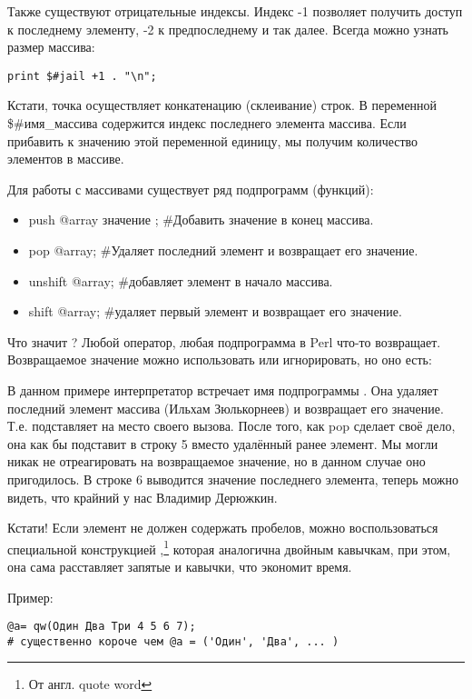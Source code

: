 Также существуют отрицательные индексы. Индекс -1 позволяет получить 
доступ к последнему элементу, -2 к предпоследнему и так далее. Всегда можно 
узнать размер массива:

\begin{verbatim}
print $#jail +1 . "\n";
\end{verbatim}

Кстати, точка осуществляет конкатенацию (склеивание) строк. В переменной 
\$\#имя\_массива содержится индекс последнего элемента массива. Если 
прибавить к значению этой переменной единицу, мы получим количество 
элементов в массиве.

Для работы с массивами существует ряд подпрограмм (функций):

\begin{itemize}
\item push @array значение ; \#Добавить значение в конец массива.
\item pop @array; \#Удаляет последний элемент и возвращает его значение.
\item unshift @array; \#добавляет элемент в начало массива.
\item shift @array; \#удаляет первый элемент и возвращает его значение.
\end{itemize}

Что значит  ? Любой оператор, любая подпрограмма в
Perl что-то возвращает. Возвращаемое значение можно использовать или
игнорировать, но оно есть:


В данном примере интерпретатор встречает имя подпрограммы . Она 
удаляет последний элемент массива (Ильхам Зюлькорнеев) и возвращает его 
значение. Т.е. подставляет на место своего вызова. После того, как pop 
сделает своё дело, она как бы подставит в строку 5 вместо  
удалённый ранее элемент. Мы могли никак не отреагировать на возвращаемое 
значение, но в данном случае оно пригодилось. В строке 6 выводится 
значение последнего элемента, теперь можно видеть, что крайний у нас 
Владимир Дерюжкин.

Кстати! Если элемент не должен содержать пробелов, можно воспользоваться 
специальной конструкцией ,\footnote{От англ. quote word} которая аналогична двойным кавычкам, 
при этом, она сама расставляет запятые и кавычки, что экономит время.

Пример:

\begin{verbatim}
@a= qw(Один Два Три 4 5 6 7);
# существенно короче чем @a = ('Один', 'Два', ... )
\end{verbatim}

